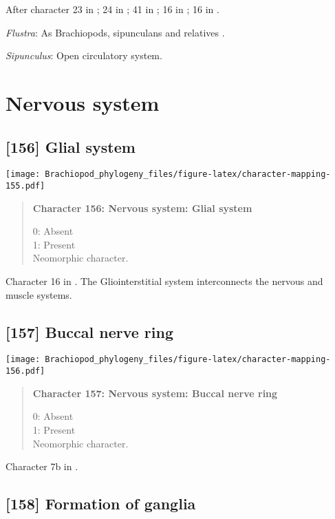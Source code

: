 \documentclass[openany]{book}
\theoremstyle{definition}
\theoremstyle{definition}
\theoremstyle{definition}
\theoremstyle{remark}
\begin{document}
After character 23 in \citet{Haszprunar1996}; 24 in
\citet{Haszprunar2000}; 41 in \citet{Rouse1999}; 16 in
\citet{Scheltema1993}; 16 in \citet{Vinther2008}.

\hypertarget{Flustra-coding-155}{}
\emph{Flustra}: As Brachiopods, sipunculans and relatives
\citep{Ruppert1983}.

\hypertarget{Sipunculus-coding-155}{}
\emph{Sipunculus}: Open circulatory system.

\section{Nervous system}\label{nervous-system}

\subsection*{{[}156{]} Glial system}\label{glial-system}

\texttt{[image: Brachiopod\_phylogeny\_files/figure-latex/character-mapping-155.pdf]}

\begin{quote}
\textbf{Character 156: Nervous system: Glial system}

0: Absent\\
1: Present\\
Neomorphic character.
\end{quote}

Character 16 in \citet{Haszprunar1996}. The Gliointerstitial system
interconnects the nervous and muscle systems.

\subsection*{{[}157{]} Buccal nerve ring}\label{buccal-nerve-ring}

\texttt{[image: Brachiopod\_phylogeny\_files/figure-latex/character-mapping-156.pdf]}

\begin{quote}
\textbf{Character 157: Nervous system: Buccal nerve ring}

0: Absent\\
1: Present\\
Neomorphic character.
\end{quote}

Character 7b in \citet{Haszprunar2008}.

\subsection*{{[}158{]} Formation of ganglia}\label{formation-of-ganglia}
\end{document}
